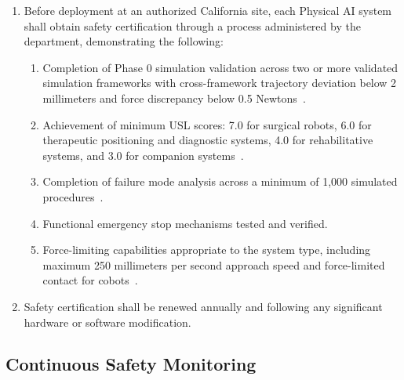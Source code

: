 \begin{enumerate}[label=(\alph*)]
\item Before deployment at an authorized California site, each Physical AI
  system shall obtain safety certification through a process administered by
  the department, demonstrating the following:
  \begin{enumerate}[label=(\arabic*)]
  \item Completion of Phase 0 simulation validation across two or more
    validated simulation frameworks with cross-framework trajectory deviation
    below 2 millimeters and force discrepancy below 0.5
    Newtons~\cite{iche6r3adapt}.
  \item Achievement of minimum USL scores: 7.0 for surgical robots, 6.0 for
    therapeutic positioning and diagnostic systems, 4.0 for rehabilitative
    systems, and 3.0 for companion systems~\cite{cfr50adapt}.
  \item Completion of failure mode analysis across a minimum of 1,000
    simulated procedures~\cite{cfr312adapt}.
  \item Functional emergency stop mechanisms tested and verified.
  \item Force-limiting capabilities appropriate to the system type, including
    maximum 250 millimeters per second approach speed and force-limited contact
    for cobots~\cite{patientinstructions2026}.
  \end{enumerate}

\item Safety certification shall be renewed annually and following any
  significant hardware or software modification.
\end{enumerate}

\subsection{Continuous Safety Monitoring}

